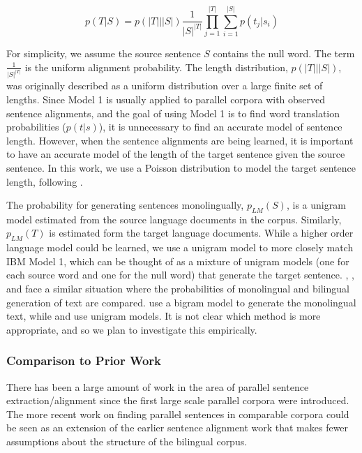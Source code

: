 \documentclass[11pt,letterpaper]{article}
\begin{document}
\begin{equation}
p(T|S) = p\left(|T|\big||S|\right) \frac{1}{|S|^{|T|}}
\prod_{j=1}^{|T|} \sum_{i=1}^{|S|} p(t_j|s_i)
\end{equation}

For simplicity, we assume the source sentence $S$ contains the null word. The
term $\frac{1}{|S|^{|T|}}$ is the uniform alignment probability. The
length distribution, $p\left(|T|\big||S|\right)$, was originally described as a uniform distribution
over a large finite set of lengths. Since Model 1 is usually applied to parallel
corpora with observed sentence alignments, and the goal of using Model 1 is to
find word translation probabilities ($p(t|s)$), it is unnecessary to find an
accurate model of sentence length. However, when the sentence alignments are
being learned, it is important to have an accurate model of the length of the
target sentence given the source sentence. In this work, we use a Poisson
distribution to model the target sentence length, following .

The probability for generating sentences monolingually, $p_{LM}(S)$, is a
unigram model estimated from the source language documents in the corpus.
Similarly, $p_{LM}(T)$ is estimated form the target language documents. While a
higher order language model could be learned, we use a unigram model to more
closely match IBM Model 1, which can be thought of as a mixture of unigram
models (one for each source word and one for the null word) that generate the
target sentence. , , and  face
a similar situation where the probabilities of monolingual and bilingual
generation of text are compared.  use a bigram model to
generate the monolingual text, while  and  use
unigram models. It is not clear which method is more appropriate, and so we plan
to investigate this empirically.

\subsubsection{Comparison to Prior Work}

There has been a large amount of work in the area of parallel sentence
extraction/alignment since the first large scale parallel corpora were
introduced. The more recent work on finding parallel sentences in comparable
corpora could be seen as an extension of the earlier sentence alignment work
that makes fewer assumptions about the structure of the bilingual corpus.
\end{document}
